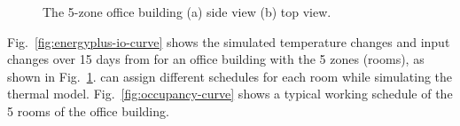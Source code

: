 

\begin{figure}[t]
    \centering
    \caption{The 5-zone office building (a) side view (b) top view.}
    \label{fig:5zone}
\end{figure}

Fig.~\ref{fig:energyplus-io-curve} shows the simulated temperature changes and
input changes over 15 days from \EP{} for an office building with the 5 zones
(rooms), as shown in Fig.~\ref{fig:5zone}.  \EP{} can assign different schedules
for each room while simulating the thermal model.
Fig.~\ref{fig:occupancy-curve} shows a typical working schedule of the 5 rooms
of the office building.

